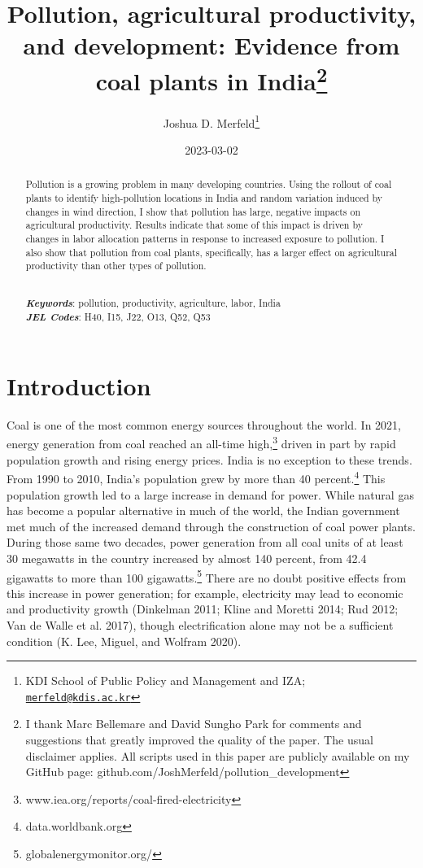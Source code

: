 \documentclass[
]{article}
\title{Pollution, agricultural productivity, and development: Evidence from coal plants in India\footnote{I thank Marc Bellemare and David Sungho Park for comments and suggestions that greatly improved the quality of the paper. The usual disclaimer applies. All scripts used in this paper are publicly available on my GitHub page: github.com/JoshMerfeld/pollution\_development}}
\author{Joshua D. Merfeld\footnote{KDI School of Public Policy and Management and IZA; \href{mailto:merfeld@kdis.ac.kr}{\nolinkurl{merfeld@kdis.ac.kr}}}}
\date{2023-03-02}
\begin{document}
\maketitle
\begin{abstract}
\noindent Pollution is a growing problem in many developing countries. Using the rollout of coal plants to identify high-pollution locations in India and random variation induced by changes in wind direction, I show that pollution has large, negative impacts on agricultural productivity. Results indicate that some of this impact is driven by changes in labor allocation patterns in response to increased exposure to pollution. I also show that pollution from coal plants, specifically, has a larger effect on agricultural productivity than other types of pollution.\\
\strut \\
\textbf{\textit{Keywords}}: pollution, productivity, agriculture, labor, India\\
\textbf{\textit{JEL Codes}}: H40, I15, J22, O13, Q52, Q53
\end{abstract}

\newpage
\doublespacing

\hypertarget{introduction}{%
\section{Introduction}\label{introduction}}

Coal is one of the most common energy sources throughout the world. In 2021, energy generation from coal reached an all-time high,\footnote{www.iea.org/reports/coal-fired-electricity} driven in part by rapid population growth and rising energy prices. India is no exception to these trends. From 1990 to 2010, India's population grew by more than 40 percent.\footnote{data.worldbank.org} This population growth led to a large increase in demand for power. While natural gas has become a popular alternative in much of the world, the Indian government met much of the increased demand through the construction of coal power plants. During those same two decades, power generation from all coal units of at least 30 megawatts in the country increased by almost 140 percent, from 42.4 gigawatts to more than 100 gigawatts.\footnote{globalenergymonitor.org/} There are no doubt positive effects from this increase in power generation; for example, electricity may lead to economic and productivity growth (Dinkelman 2011; Kline and Moretti 2014; Rud 2012; Van de Walle et al. 2017), though electrification alone may not be a sufficient condition (K. Lee, Miguel, and Wolfram 2020).
\end{document}
